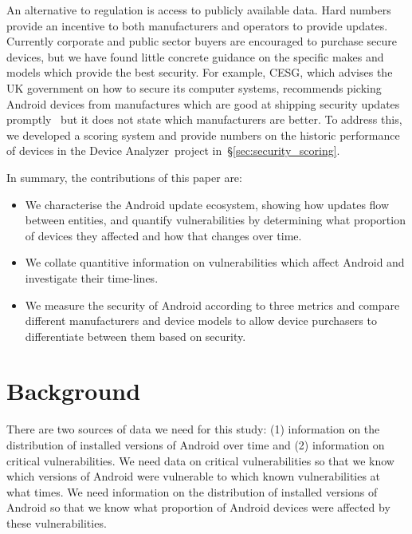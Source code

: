 \documentclass[conference,a4paper,twoside]{IEEEtran}
\newcommand{\da}{Device Analyzer}
\begin{document}
An alternative to regulation is access to publicly available data. 
Hard numbers provide an incentive to both manufacturers and operators to provide updates.
Currently corporate and public sector buyers are encouraged to purchase secure devices, but we have found little concrete guidance on the specific makes and models which provide the best security. 
For example, CESG, which advises the UK government on how to secure its computer systems, recommends picking Android devices from manufactures which are good at shipping security updates promptly~\cite{CESG2013} but it does not state which manufacturers are better.
To address this, we developed a scoring system and provide numbers on the historic performance of devices in the \da\ project in~\S\ref{sec:security_scoring}.

%

In summary, the contributions of this paper are:
\begin{itemize}
 \item We characterise the Android update ecosystem, showing how updates flow between entities, and quantify vulnerabilities by determining what proportion of devices they affected and how that changes over time.
 \item We collate quantitive information on vulnerabilities which affect Android and investigate their time-lines.
 \item We measure the security of Android according to three metrics and compare different manufacturers and device models to allow device purchasers to differentiate between them based on security.
\end{itemize}

\section{Background}
\label{sec:background}
There are two sources of data we need for this study: (1) information on the distribution of installed versions of Android over time and (2) information on critical vulnerabilities.
We need data on critical vulnerabilities so that we know which versions of Android were vulnerable to which known vulnerabilities at what times.
We need information on the distribution of installed versions of Android so that we know what proportion of Android devices were affected by these vulnerabilities.
\end{document}
